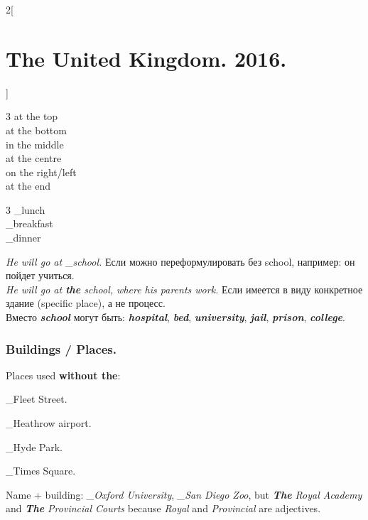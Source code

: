 \documentclass[10pt,a4paper]{article}
\newcommand\ex[1]{\textit{\textbf{{#1}}}}           %
\newcommand\za{\_\thinspace }                       %
\begin{document}
\begin{multicols}{2}[\section{The United Kingdom. 2016.}]
\begin{multicols}{3}
at the top\\
at the bottom\\
in the middle\\
at the centre\\
on the right/left\\
at the end
\end{multicols}

\begin{multicols}{3}
\za lunch\\
\za breakfast\\
\za dinner
\end{multicols}

\textit{He will go at \za school.} Если можно переформулировать без school, например: он пойдет учиться.\\
\textit{He will go at \textbf{the} school, where his parents work.} Если имеется в виду конкретное здание (specific place), а не процесс.\\
Вместо \ex{school} могут быть: \ex{hospital}, \ex{bed}, \ex{university}, \ex{jail}, \ex{prison}, \ex{college}.



\subsubsection{Buildings / Places.}
Places used \textbf{without the}:
\begin{description}[leftmargin=2.9cm,style=nextline,before={\renewcommand\makelabel[1]{##1:}}]
  \item[Streets, roads] \za Fleet Street.
  \item[Airports] \za Heathrow airport.
  \item[Parks] \za Hyde Park.
  \item[Squares] \za Times Square.
\end{description}
\vspace{-\parskip}
Name + building: \textit{\za Oxford University}, \textit{\za San Diego Zoo}, but \textit{\ex{The} Royal Academy} and \textit{\ex{The} Provincial Courts} because \textit{Royal} and \textit{Provincial} are adjectives.





\end{multicols}
\end{document}
